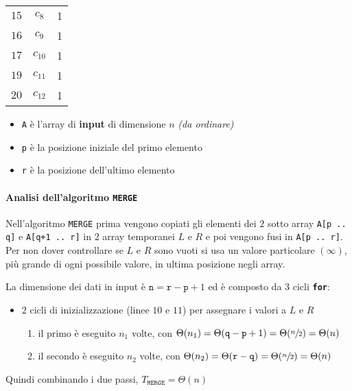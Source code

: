 \documentclass[italian, 10pt]{article}
\begin{document}
\begin{minipage}{0.99\textwidth}
\begin{minipage}{0.99\textwidth}
\begin{minipage}[t]{0.495\textwidth}
\begin{tabular}[t]{ccc}
        \(15\)        & \(c_8\)         & 1                           \\
        \(16\)        & \(c_9\)         & 1                           \\
        \(17\)        & \(c_10\)        & 1                           \\
        \(19\)        & \(c_11\)        & 1                           \\
        \(20\)        & \(c_12\)        & 1                           \\
      \end{tabular}
    \end{minipage}
  \end{minipage}
\end{minipage}

\begin{itemize}
  \item \texttt{A} è l'array di \textbf{input} di dimensione \(n\) \textit{(da ordinare)}
  \item \texttt{p} è la posizione iniziale del primo elemento
  \item \texttt{r} è la posizione dell'ultimo elemento
\end{itemize}

\paragraph{Analisi dell'algoritmo \texttt{MERGE}}

Nell'algoritmo \texttt{MERGE} prima vengono copiati gli elementi dei \(2\) sotto array \texttt{A[p .. q]} e \texttt{A[q+1 .. r]} in \(2\) array temporanei \(L\) e \(R\) e poi vengono fusi in \texttt{A[p .. r]}.
Per non dover controllare se \(L\) e \(R\) sono vuoti si usa un valore particolare \((\infty)\), più grande di ogni possibile valore, in ultima posizione negli array.

La dimensione dei dati in input è \(\texttt{n} = \texttt{r} - \texttt{p} + 1\) ed è composto da \(3\) cicli \textbf{\texttt{for}}:

\begin{itemize}
  \item \(2\) cicli di inizializzazione (linee \(10\) e \(11\)) per assegnare i valori a \(L\) e \(R\)
        \begin{enumerate}
          \item il primo è eseguito \(n_1\) volte, con \(\Theta(n_1) = \Theta(\texttt{q}-\texttt{p}+1) = \Theta(\sfrac{n}{2}) = \Theta(n)\)
          \item il secondo è eseguito \(n_2\) volte, con \(\Theta(n_2) = \Theta(\texttt{r}-\texttt{q}) = \Theta(\sfrac{n}{2}) = \Theta(n)\)
        \end{enumerate}
\end{itemize}
Quindi combinando i due passi, \(T_\texttt{MERGE} = \Theta(n)\)
\end{document}
